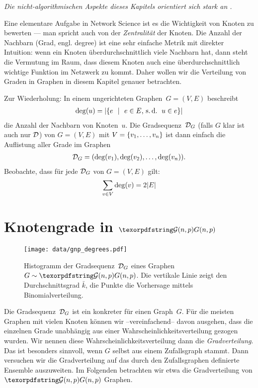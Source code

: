 \emph{Die nicht-algorithmischen Aspekte dieses Kapitels orientiert sich stark an \cite{barabasi2014network}.}
\bigskip

Eine elementare Aufgabe in Network Science ist es die Wichtigkeit von Knoten zu bewerten --- man spricht auch  von der \emph{Zentralität} der Knoten.
Die Anzahl der Nachbarn (Grad, engl. degree) ist eine sehr einfache Metrik mit direkter Intuition:
wenn ein Knoten überdurchschnittlich viele Nachbarn hat, dann steht die Vermutung im Raum, dass diesem Knoten auch eine überdurchschnittlich wichtige Funktion im Netzwerk zu kommt.
Daher wollen wir die Verteilung von Graden in Graphen in diesem Kapitel genauer betrachten.

Zur Wiederholung:
In einem ungerichteten Graphen~$G=(V,E)$ beschreibt
\begin{align}
    \deg(u) = \card{\twoset{e}{e \in E\text{, \sd\,} u \in e}}
\end{align}
die Anzahl der Nachbarn von Knoten~$u$.
Die  Gradsequenz~$\mathcal{D}_G$ (falls $G$ klar ist auch nur $\mathcal{D}$) von $G=(V,E)$ mit $V=\left\{v_1, \ldots, v_n\right\}$ ist dann einfach die Auflistung aller Grade im Graphen
\begin{align}
    \mathcal{D}_G = (\deg(v_1), \deg(v_2), \ldots, \deg(v_n)).
\end{align}
Beobachte, dass für jede $\mathcal{D}_G$ von $G=(V,E)$ gilt:
\begin{align}
    \sum_{v \in V} \deg(v) = 2 \lvert E\rvert
\end{align}


\section{Knotengrade in $\Gnp$}
\begin{figure}
    \begin{center}
        \texttt{[image: data/gnp\_degrees.pdf]}
    \end{center}
    \caption{
        Histogramm der Gradsequenz~$\mathcal{D}_G$ eines Graphen~$G \sim \Gnp$.
        Die vertikale Linie zeigt den Durchschnittsgrad $\bar k$,
        die Punkte die Vorhersage mittels Binomialverteilung.
    }
    \label{fig:histogram_grade_gnp}
\end{figure}

Die Gradsequenz~$\mathcal{D}_G$ ist ein konkreter  für einen Graph~$G$.
Für die meisten Graphen mit vielen Knoten können wir --vereinfachend-- davon ausgehen, dass die einzelnen Grade unabhängig aus einer Wahrscheinlichkeitsverteilung gezogen wurden.
Wir  nennen diese Wahrscheinlichkeitsverteilung dann die \emph{Gradverteilung}.
Das ist besonders sinnvoll, wenn $G$ selbst aus einem Zufallsgraph stammt.
Dann versuchen wir die Gradverteilung auf das durch den Zufallsgraphen definierte Ensemble auszuweiten.
Im Folgenden betrachten wir etwa die Gradverteilung von $\Gnp$ Graphen.

